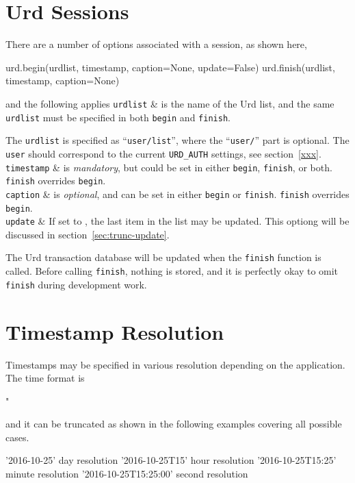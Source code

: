 \section{Urd Sessions}

There are a number of options associated with a session, as shown
here,
\begin{python}
urd.begin(urdlist, timestamp, caption=None, update=False)
urd.finish(urdlist, timestamp, caption=None)
\end{python}
and the following applies
\starttabletwo
\RPtwo \texttt{urdlist} & is the name of the Urd list, and the same
  \texttt{urdlist} must be specified in both \texttt{begin}
  and \texttt{finish}.

  The \texttt{urdlist} is specified as
  ``\texttt{user/list}'', where the ``\texttt{user/}'' part is
  optional.  The \texttt{user} should correspond to the
  current \texttt{URD\_AUTH} settings, see section~\ref{xxx}.\\[2ex]

\RPtwo \texttt{timestamp} & is \textsl{mandatory}, but could be set in either
  \texttt{begin}, \texttt{finish}, or both.  \texttt{finish}
  overrides \texttt{begin}.\\[2ex]

\RPtwo \texttt{caption} & is \textsl{optional}, and can be set in either
  \texttt{begin} or \texttt{finish}.  \texttt{finish}
  overrides \texttt{begin}.\\[2ex]

\RPtwo \texttt{update} &  If set to \pyTrue, the last item in the list may be updated.
  This optiong will be discussed in section~\ref{sec:trunc-update}.\\[2ex]
\stoptabletwo

The Urd transaction database will be updated when the \texttt{finish}
function is called.  Before calling \texttt{finish}, nothing is
stored, and it is perfectly okay to omit \texttt{finish} during
development work.




\section{Timestamp Resolution}

Timestamps may be specified in various resolution depending on the
application.  The time format is
\begin{python}
"%
\end{python}
and it can be truncated as shown in the following examples covering
all possible cases.
\begin{python}
'2016-10-25'               day resolution
'2016-10-25T15'            hour resolution
'2016-10-25T15:25'         minute resolution
'2016-10-25T15:25:00'      second resolution
\end{python}



